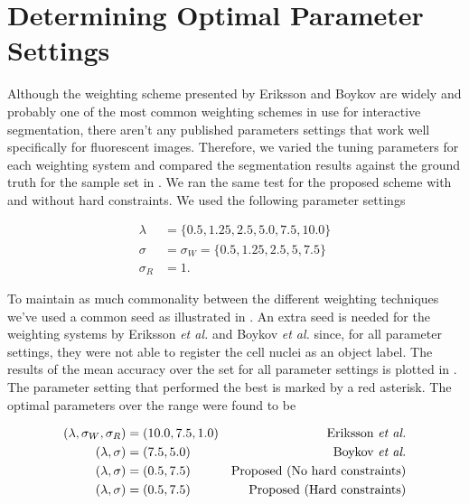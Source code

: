 
\section{Determining Optimal Parameter Settings}
\label{sec:optimalparameters}

Although the weighting scheme presented by Eriksson \citep{Eriksson2006} and Boykov \citep{Boykov2001_2} are widely and probably one of the most common weighting schemes in use for interactive segmentation, there aren't any published parameters settings that work well specifically for fluorescent images. Therefore, we varied the tuning parameters for each weighting system and compared the segmentation results against the ground truth for the sample set in . We ran the same test for the proposed scheme with and without hard constraints. We used the following parameter settings

\begin{align*}
	\lambda & = \{ 0.5, 1.25, 2.5, 5.0, 7.5, 10.0 \}\\
	\sigma & = \sigma_W = \{ 0.5, 1.25, 2.5, 5, 7.5 \}\\
	\sigma_R & = 1.
\end{align*}

To maintain as much commonality between the different weighting techniques we've used a common seed as illustrated in . An extra seed is needed for the weighting systems by Eriksson \textit{et al.} and Boykov \textit{et al.} since, for all parameter settings, they were not able to register the cell nuclei as an object label. The results of the mean accuracy over the set for all parameter settings is plotted in . The parameter setting that performed the best is marked by a red asterisk. The optimal parameters over the range were found to be 

\begin{align*}
	( \lambda, \sigma_W, \sigma_R ) &= (10.0, 7.5, 1.0) & \text{Eriksson \textit{et al.}}\\
	( \lambda, \sigma) &= (7.5, 5.0) & \text{Boykov \textit{et al.}}\\
	( \lambda, \sigma) &= (0.5, 7.5) & \text{Proposed (No hard constraints)}\\
	( \lambda, \sigma) &= (0.5, 7.5) & \text{Proposed (Hard constraints)}
\end{align*}

